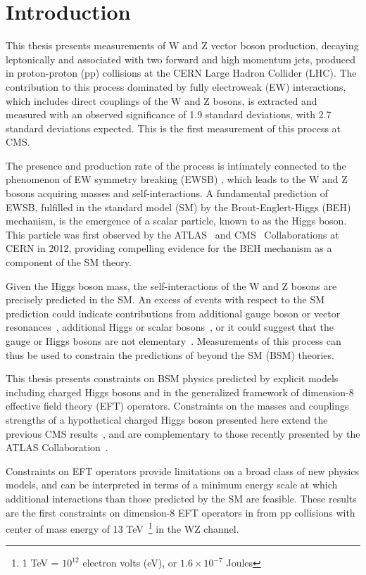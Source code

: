 \chapter{Introduction}
\label{ch:introduction}

This thesis presents measurements of W and Z vector boson production, 
decaying leptonically and associated
with two forward and high momentum jets, produced in proton-proton (pp) collisions
at the CERN Large Hadron Collider (LHC). 
The contribution to this process dominated by fully electroweak (EW)
interactions, which includes direct couplings of the W and Z bosons, 
is extracted and measured with an observed significance of
1.9 standard deviations, with 2.7 standard deviations expected. 
This is the first measurement of this process at CMS. 

The presence and production rate of the \EWWZ process is intimately connected to the 
phenomenon of EW symmetry breaking (EWSB) \cite{Quigg:2009vq}, which leads to 
the W and Z bosons acquiring masses
and self-interactions. A fundamental prediction
of EWSB, fulfilled in the standard model (SM) by the Brout-Englert-Higgs (BEH) mechanism,
is the emergence of a scalar particle, known 
to as the Higgs boson. 
This particle was first observed by the 
ATLAS~\cite{Aad:2012tfa} and CMS~\cite{Chatrchyan:2012xdj,Chatrchyan:2013lba} Collaborations
at CERN in 2012, providing compelling evidence for the BEH mechanism as
a component of the SM theory.

Given the Higgs boson mass, the self-interactions 
of the W and Z bosons are precisely predicted in the SM. 
An excess of \EWWZ events with respect to the SM prediction could indicate contributions from 
additional gauge boson or vector resonances~\cite{Delgado:2017cls}, 
additional Higgs or scalar bosons~\cite{Kilian:2015opv}, 
or it could suggest that the gauge or Higgs bosons are not elementary~\cite{Csaki:2015hcd}.
Measurements of this process can thus be used to constrain the predictions
of beyond the SM (BSM) theories. 

This thesis presents constraints on BSM physics predicted by explicit models
including charged Higgs bosons 
and in the generalized framework of dimension-8 effective field theory (EFT) operators.
Constraints on the masses and couplings strengths of a hypothetical
charged Higgs boson presented here extend the previous CMS results~\cite{Sirunyan:2017sbn}, and
are complementary to those recently presented by the ATLAS Collaboration~\cite{Aaboud:2018ohp}. 

Constraints on EFT operators provide limitations on a broad class of new physics
models, and can be interpreted in terms of a minimum energy scale at which additional
interactions than those predicted by the SM are feasible.
These results are the first constraints on dimension-8 EFT operators 
in from pp collisions with center of mass energy of 
13 TeV~\footnote{1 TeV = $10^{12}$ electron volts (eV), or $1.6\times10^{-7}$ Joules} in the WZ channel.

